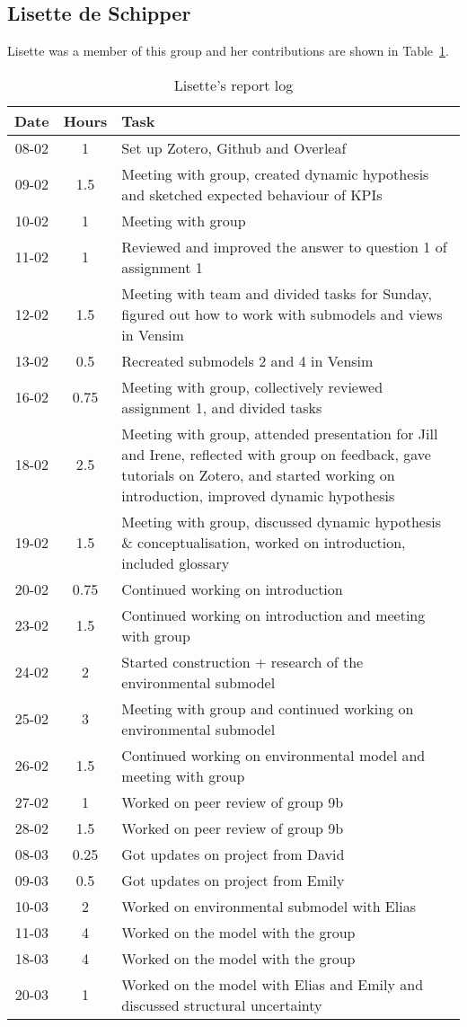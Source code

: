 \subsection{Lisette de Schipper}
Lisette was a member of this group and her contributions are shown in Table~\ref{tab:lisette_log}. 
\begin{longtable}[c]{c|c|m{35em}}
\caption{Lisette's report log}
\label{tab:lisette_log}\\
\textbf{Date}& \textbf{Hours} & \textbf{Task} \\
\hline
\endfirsthead
%
\endhead
%
08-02 & 1 & Set up Zotero, Github and Overleaf \\
09-02 & 1.5 & Meeting with group, created dynamic hypothesis and sketched expected behaviour of KPIs\\
10-02 & 1 & Meeting with group \\
11-02 & 1 & Reviewed and improved the answer to question 1 of assignment 1 \\
12-02 & 1.5 & Meeting with team and divided tasks for Sunday, figured out how to work with submodels and views in Vensim \\
13-02 & 0.5 & Recreated submodels 2 and 4 in Vensim \\
16-02 & 0.75 & Meeting with group, collectively reviewed assignment 1, and divided tasks \\
18-02 & 2.5 & Meeting with group, attended presentation for Jill and Irene, reflected with group on feedback, gave tutorials on Zotero, and started working on introduction, improved dynamic hypothesis \\
19-02 & 1.5 & Meeting with group, discussed dynamic hypothesis \& conceptualisation, worked on introduction, included glossary \\
20-02 & 0.75 & Continued working on introduction \\
23-02 & 1.5 & Continued working on introduction and meeting with group \\
24-02 & 2 & Started construction + research of the environmental submodel \\
25-02 & 3 & Meeting with group and continued working on environmental submodel \\
26-02 & 1.5 & Continued working on environmental model and meeting with group \\
27-02 & 1 & Worked on peer review of group 9b \\
28-02 & 1.5 & Worked on peer review of group 9b \\
08-03 & 0.25 & Got updates on project from David \\
09-03 & 0.5 & Got updates on project from Emily \\
10-03 & 2 & Worked on environmental submodel with Elias \\
11-03 & 4 & Worked on the model with the group \\
18-03 & 4  & Worked on the model with the group \\
20-03 & 1 & Worked on the model with Elias and Emily and discussed structural uncertainty
\end{longtable}

